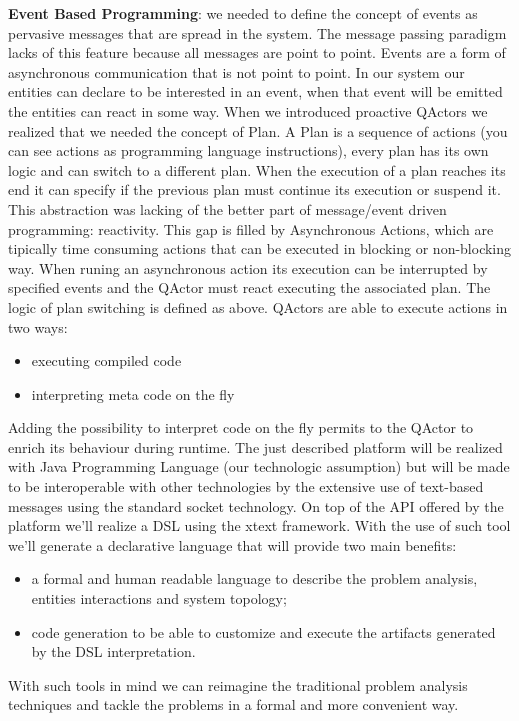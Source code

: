 \textbf{Event Based Programming}: we needed to define the concept of events as pervasive messages that are spread in the system. The message passing paradigm
lacks of this feature because all messages are point to point. Events are a form
of asynchronous communication that is not point to point. In our system our
entities can declare to be interested in an event, when that event will be emitted
the entities can react in some way.
When we introduced proactive QActors we realized that we needed the concept
of Plan. A Plan is a sequence of actions (you can see actions as programming
language instructions), every plan has its own logic and can switch to a different
plan. When the execution of a plan reaches its end it can specify if the
previous plan must continue its execution or suspend it. This abstraction was
lacking of the better part of message/event driven programming: reactivity. This
gap is filled by Asynchronous Actions, which are tipically time
consuming actions that can be executed in blocking or non-blocking way. When
runing an asynchronous action its execution can be interrupted by specified
events and the QActor must react executing the associated plan. The logic of
plan switching is defined as above. QActors are able to execute actions in two
ways:
\begin{itemize}
	\item executing compiled code
	\item interpreting meta code on the fly
\end{itemize} 
Adding the possibility to interpret code on the fly permits to the QActor to enrich
its behaviour during runtime. The just described platform will be realized with
Java Programming Language (our technologic assumption) but will be made
to be interoperable with other technologies by the extensive use of text-based
messages using the standard socket technology.
On top of the API offered by the platform we’ll realize a DSL using the xtext
framework. With the use of such tool we’ll generate a declarative language that
will provide two main benefits:
\begin{itemize}
	\item a formal and human readable language to describe the problem analysis,
	entities interactions and system topology;
	\item code generation to be able to customize and execute the artifacts generated by the DSL interpretation.
\end{itemize}
With such tools in mind we can reimagine the traditional problem analysis
techniques and tackle the problems in a formal and more convenient way.